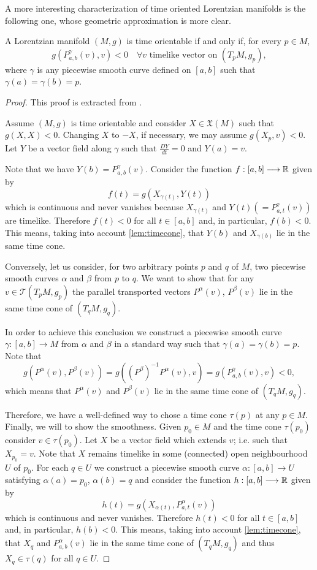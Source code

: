A more interesting characterization of time oriented Lorentzian manifolds is the following one, whose geometric approximation is more clear.

\begin{corollary}
	\label{cor:timeorientable2}
	A Lorentzian manifold $(M,g)$ is time orientable if and only if, for every $p \in M$,
	\[
	g(P^\gamma_{a,b}(v), v) < 0 \quad \forall v \textrm{ timelike vector on } (T_pM, g_p),
	\]
	where $\gamma$ is any piecewise smooth curve defined on $[a,b]$ such that $\gamma(a) = \gamma(b) = p$.
\end{corollary}

\begin{proof}
	This proof is extracted from \cite[p. 202]{romero10}.
	
	Assume $(M,g)$ is time orientable and consider $X \in \mathfrak{X}(M)$ such that $g(X,X)<0$. Changing $X$ to $-X$, if necessary, we may assume $g(X_p,v)<0$. Let $Y$ be a vector field along $\gamma$ such that $\frac{DY}{dt}=0$ and $Y(a)=v$.
	
	Note that we have $Y(b)=P_{a,b}^{\gamma}(v)$. Consider the function $f : [a,b] \longrightarrow \mathbb{R}$ given by
	\[
	f(t)= g(X_{\gamma(t)},Y(t))
	\]
	which is continuous and never vanishes because $X_{\gamma(t)}$ and $Y(t)(=P_{a,t}^{\gamma}(v))$ are timelike. Therefore $f(t)<0$ for all $t\in [a,b]$ and, in particular, $f(b)<0$. This means, taking into account \autoref{lem:timecone}, that $Y(b)$ and $X_{\gamma(b)}$ lie in the same time cone.
	
	Conversely, let us consider, for two arbitrary points $p$ and $q$ of $M$, two piecewise smooth curves $\alpha$ and $\beta$ from $p$ to $q$. We want to show that for any $v\in \mathcal{T}(T_pM,g_p)$ the parallel transported vectors $P^{\alpha}(v)$, $P^{\beta}(v)$ lie in the same time cone of $(T_qM,g_q)$.
	
	In order to achieve this conclusion we construct a piecewise smooth curve $\gamma : [a,b] \longrightarrow M$ from $\alpha$ and $\beta$ in a standard way such that $\gamma(a)=\gamma(b)=p$. Note that $$g(P^{\alpha}(v),P^{\beta}(v))=g((P^{\beta})^{-1}P^{\alpha}(v),v)=g(P_{a,b}^{\gamma}(v),v)<0,$$ which means that $P^{\alpha}(v)$ and $P^{\beta}(v)$ lie in the same time cone of $(T_qM,g_q)$.
	
	Therefore, we have a well-defined way to chose a time cone $\tau(p)$ at any $p \in M$. Finally, we will to show the smoothness. Given $p_0 \in M$ and the time cone $\tau(p_0)$ consider $v \in \tau(p_0)$. Let $X$ be a vector field which extends $v$; i.e. such that $X_{p_{0}}=v$. Note that $X$ remains timelike in some (connected) open neighbourhood $U$ of $p_0$. For each $q \in U$ we construct a piecewise smooth curve $\alpha : [a,b] \longrightarrow U$ satisfying $\alpha(a)=p_0$,
	$\alpha(b)=q$ and consider the function $h : [a,b] \longrightarrow \mathbb{R}$ given by
	\[
	h(t)=g(X_{\alpha(t)},P_{a,t}^{\alpha}(v))
	\]
	which is continuous and never vanishes. Therefore $h(t)<0$ for all $t\in [a,b]$ and, in particular, $h(b)<0$. This means, taking into account \autoref{lem:timecone}, that $X_q$ and $P_{a,b}^{\alpha}(v)$ lie in the same time cone of $(T_qM,g_q)$ and thus $X_q \in \tau(q)$ for all $q \in U$.
\end{proof}

